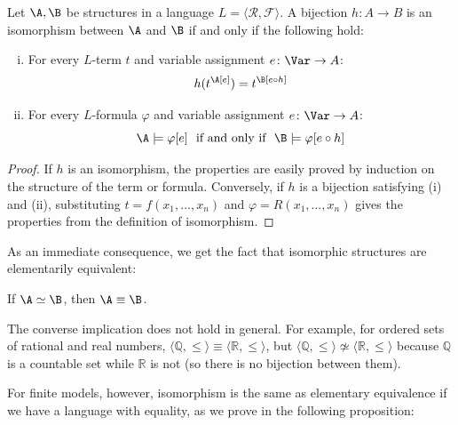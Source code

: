 \begin{proposition}\label{proposition:isomorphism-preserves-semantics}
Let $\A, \B$ be structures in a language $L = \langle\mathcal{R}, \mathcal{F}\rangle$. A bijection $h\colon A \to B$ is an isomorphism between $\A$ and $\B$ if and only if the following hold:
\begin{enumerate}[(i)]
    \item For every $L$-term $t$ and variable assignment $e\colon \Var \to A$:
    $$
    h(t^\A[e]) = t^\B[e \circ h]
    $$
    \item For every $L$-formula $\varphi$ and variable assignment $e\colon \Var \to A$:
    $$
    \A \models \varphi[e]\ \text{ if and only if }\ \B \models \varphi[e \circ h]
    $$
\end{enumerate}
\end{proposition}
\begin{proof}
    If $h$ is an isomorphism, the properties are easily proved by induction on the structure of the term or formula. Conversely, if $h$ is a bijection satisfying (i) and (ii), substituting $t = f(x_1, \dots, x_n)$ and $\varphi = R(x_1, \dots, x_n)$ gives the properties from the definition of isomorphism.
\end{proof}

As an immediate consequence, we get the fact that isomorphic structures are elementarily equivalent:

\begin{corollary}\label{corollary:isomorphic-implies-elementarily-equivalent}
    If $\A \simeq \B$, then $\A \equiv \B$.
\end{corollary}

\begin{remark}
    The converse implication does not hold in general. For example, for ordered sets of rational and real numbers, $\langle\mathbb{Q}, \leq \rangle \equiv \langle\mathbb{R}, \leq \rangle$, but $\langle\mathbb{Q}, \leq \rangle \not\simeq \langle \mathbb{R}, \leq \rangle$ because $\mathbb{Q}$ is a countable set while $\mathbb{R}$ is not (so there is no bijection between them).
\end{remark}

For finite models, however, isomorphism is the same as elementary equivalence if we have a language with equality, as we prove in the following proposition:

